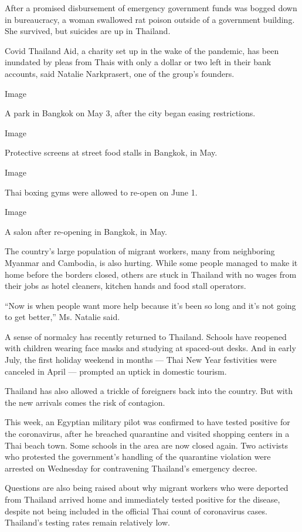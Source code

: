 After a promised disbursement of emergency government funds was bogged
down in bureaucracy, a woman swallowed rat poison outside of a
government building. She survived, but suicides are up in Thailand.

Covid Thailand Aid, a charity set up in the wake of the pandemic, has
been inundated by pleas from Thais with only a dollar or two left in
their bank accounts, said Natalie Narkprasert, one of the group's
founders.

Image

A park in Bangkok on May 3, after the city began easing restrictions.

Image

Protective screens at street food stalls in Bangkok, in May.

Image

Thai boxing gyms were allowed to re-open on June 1.

Image

A salon after re-opening in Bangkok, in May.

The country's large population of migrant workers, many from neighboring
Myanmar and Cambodia, is also hurting. While some people managed to make
it home before the borders closed, others are stuck in Thailand with no
wages from their jobs as hotel cleaners, kitchen hands and food stall
operators.

``Now is when people want more help because it's been so long and it's
not going to get better,'' Ms. Natalie said.

A sense of normalcy has recently returned to Thailand. Schools have
reopened with children wearing face masks and studying at spaced-out
desks. And in early July, the first holiday weekend in months --- Thai
New Year festivities were canceled in April --- prompted an uptick in
domestic tourism.

Thailand has also allowed a trickle of foreigners back into the country.
But with the new arrivals comes the risk of contagion.

This week, an Egyptian military pilot was confirmed to have tested
positive for the coronavirus, after he breached quarantine and visited
shopping centers in a Thai beach town. Some schools in the area are now
closed again. Two activists who protested the government's handling of
the quarantine violation were arrested on Wednesday for contravening
Thailand's emergency decree.

Questions are also being raised about why migrant workers who were
deported from Thailand arrived home and immediately tested positive for
the disease, despite not being included in the official Thai count of
coronavirus cases. Thailand's testing rates remain relatively low.

